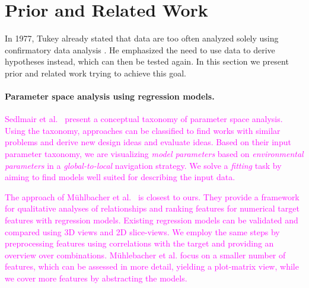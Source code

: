 \documentclass[journal]{style/vgtc} 			          %
\newcommand{\magenta}[1]{\textcolor{magenta}{#1}}
\begin{document}
\section{Prior and Related Work}
In 1977, Tukey already stated that data are too often analyzed solely using confirmatory data analysis \cite{Tukey}.
He emphasized the need to use data to derive hypotheses instead, which can then be tested again.
In this section we present prior and related work trying to achieve this goal.
\paragraph{Parameter space analysis using regression models.}
\magenta{
Sedlmair et al.~\cite{Sedlmair} present a conceptual taxonomy of parameter space analysis.
Using the taxonomy, approaches can be classified to find works with similar problems and derive new design ideas and evaluate ideas.
Based on their input parameter taxonomy, we are visualizing \emph{model parameters} based on \emph{environmental parameters} in a \emph{global-to-local} navigation strategy.
We solve a \emph{fitting} task by aiming to find models well suited for describing the input data.
}

\magenta{
The approach of M\"{u}hlbacher et al.~\cite{Muehlbacher} is closest to ours.
They provide a framework for qualitative analyses of relationships and ranking features for numerical target features with regression models.
Existing regression models can be validated and compared using 3D views and 2D slice-views.
We employ the same steps by preprocessing features using correlations with the target and providing an overview over combinations.
M\"{u}hlebacher et al. focus on a smaller number of features, which can be assessed in more detail, yielding a plot-matrix view, while we cover more features by abstracting the models.
}
\end{document}
